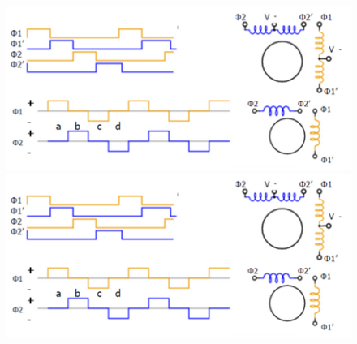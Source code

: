 \begin{figure}[h]
  \begin{center}
    \includegraphics[scale = 1]{img/Picture9.png}
  \end{center}
    \begin{center}
        \includegraphics[scale = 1]{img/Picture9.png}
    \end{center}
\end{figure}

